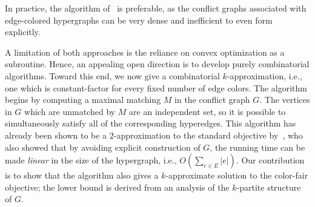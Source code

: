 In practice, the algorithm of~ is preferable, as
the conflict graphs associated with edge-colored hypergraphs can be very dense and inefficient to even form explicitly.
%
%

A limitation of both approaches is the reliance on convex optimization as a subroutine.
Hence, an appealing open direction is to develop purely combinatorial algorithms.
Toward this end, we now give a combinatorial $k$-approximation, i.e., one which is constant-factor for every fixed number of edge colors. The algorithm begins by computing a maximal matching $M$ in the conflict graph $G$.
The vertices in $G$ which are unmatched by $M$ are an independent set, so it is possible to simultaneously satisfy all of the corresponding hyperedges.
This algorithm has already been shown to be a $2$-approximation to the standard \minecc{} objective by~\citet{veldt2023optimal}, who also showed that by avoiding explicit construction of $G$, the running time can be made \emph{linear} in the size of the hypergraph, i.e., $O(\sum_{e \in E} |e|)$.
Our contribution is to show that the algorithm also gives a $k$-approximate solution to the color-fair objective; the lower bound is derived from an analysis of the $k$-partite structure of $G$.

